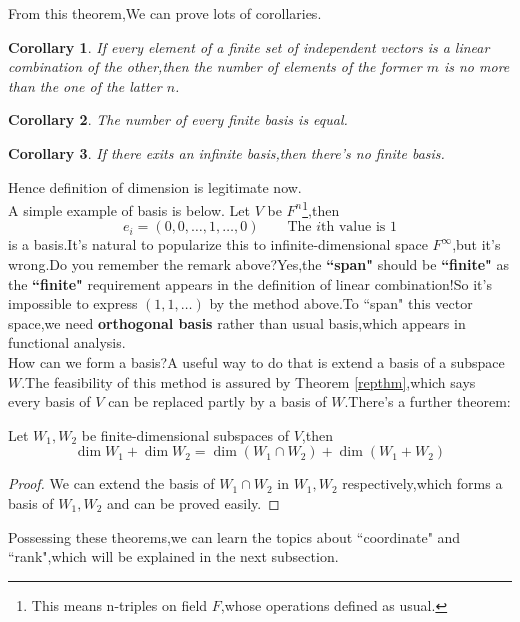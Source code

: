 \documentclass{article}
\begin{document}
From this theorem,We can prove lots of corollaries.
\theoremstyle{plain}\newtheorem{coro}{Corollary}[section]
\begin{coro}
	If every element of a finite set of independent vectors is a linear combination of the other,then the number of elements of the former $m$ is no more than the one of the latter $n$.  
\end{coro}
\begin{coro}
	The number of every finite basis is equal.
\end{coro}
\begin{coro}
	If there exits an infinite basis,then there's no finite basis.
\end{coro}
Hence definition of dimension is legitimate now.\\
\indent A simple example of basis is below.
Let $V$ be $F^n$\footnote{This means n-triples on field $F$,whose operations defined as usual.},then
\[e_i=(0,0,\dots,1,\dots,0)\qquad\text{The $i$th value is $1$}\]
is a basis.It's natural to popularize this to infinite-dimensional space $F^{\infty}$,but it's wrong.Do you remember the remark above?Yes,the \textbf{``span"} should be \textbf{``finite"} as the \textbf{``finite"} requirement appears in the definition of linear combination!So it's impossible to express $(1,1,\dots)$ by the method above.To ``span" this vector space,we need \textbf{orthogonal basis} rather than usual basis,which appears in functional analysis.\\
\indent How can we form a basis?A useful way to do that is extend a basis of a subspace $W$.The feasibility of this method is assured by Theorem \ref{repthm},which says every basis of $V$ can be replaced partly by a basis of $W$.There's a further theorem:
\begin{thm}
	Let $W_1,W_2$ be finite-dimensional subspaces of $V$,then
	\[\dim W_1+\dim W_2 =\dim(W_1\cap W_2)+\dim(W_1+W_2)\]
\end{thm} 
\begin{proof}
	We can extend the basis of $W_1\cap W_2$ in $W_1,W_2$ respectively,which forms a basis of $W_1,W_2$ and can be proved easily.
\end{proof}
Possessing these theorems,we can learn the topics about ``coordinate" and ``rank",which will be explained in the next subsection.
\end{document}
